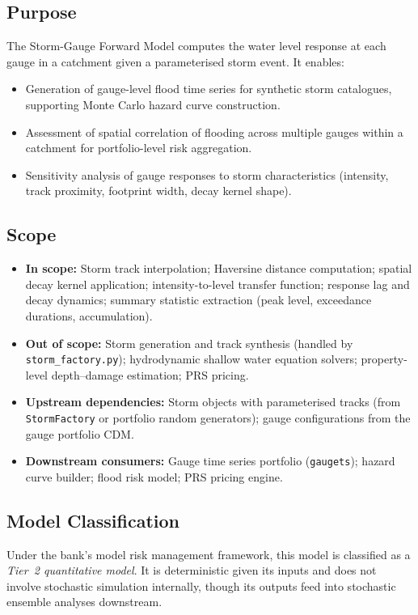 \documentclass[11pt,a4paper]{article}
\begin{document}
\subsection{Purpose}
The Storm-Gauge Forward Model computes the water level response at each gauge
in a catchment given a parameterised storm event. It enables:
\begin{itemize}[nosep]
    \item Generation of gauge-level flood time series for synthetic storm
          catalogues, supporting Monte Carlo hazard curve construction.
    \item Assessment of spatial correlation of flooding across multiple gauges
          within a catchment for portfolio-level risk aggregation.
    \item Sensitivity analysis of gauge responses to storm characteristics
          (intensity, track proximity, footprint width, decay kernel shape).
\end{itemize}

\subsection{Scope}
\begin{itemize}[nosep]
    \item \textbf{In scope:} Storm track interpolation; Haversine distance
          computation; spatial decay kernel application; intensity-to-level
          transfer function; response lag and decay dynamics; summary statistic
          extraction (peak level, exceedance durations, accumulation).
    \item \textbf{Out of scope:} Storm generation and track synthesis (handled
          by \texttt{storm\_factory.py}); hydrodynamic shallow water equation
          solvers; property-level depth--damage estimation; PRS pricing.
    \item \textbf{Upstream dependencies:} Storm objects with parameterised
          tracks (from \texttt{StormFactory} or portfolio random generators);
          gauge configurations from the gauge portfolio CDM.
    \item \textbf{Downstream consumers:} Gauge time series portfolio
          (\texttt{gaugets}); hazard curve builder; flood risk model; PRS
          pricing engine.
\end{itemize}

\subsection{Model Classification}
Under the bank's model risk management framework, this model is classified as a
\emph{Tier~2 quantitative model}. It is deterministic given its inputs and does
not involve stochastic simulation internally, though its outputs feed into
stochastic ensemble analyses downstream.
\end{document}
